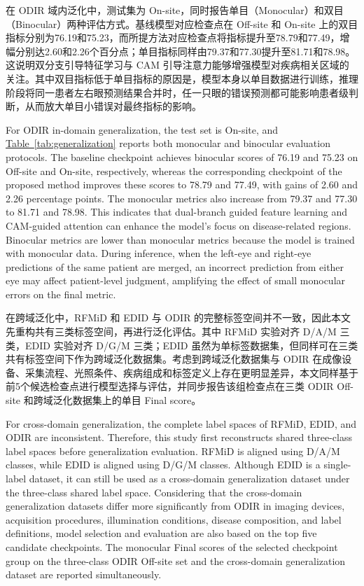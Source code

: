 

在 ODIR 域内泛化中，测试集为 On-site，同时报告单目（Monocular）和双目（Binocular）两种评估方式。基线模型对应检查点在 Off-site 和 On-site 上的双目指标分别为76.19和75.23，而所提方法对应检查点将指标提升至78.79和77.49，增幅分别达2.60和2.26个百分点；单目指标同样由79.37和77.30提升至81.71和78.98。这说明双分支引导特征学习与 CAM 引导注意力能够增强模型对疾病相关区域的关注。其中双目指标低于单目指标的原因是，模型本身以单目数据进行训练，推理阶段将同一患者左右眼预测结果合并时，任一只眼的错误预测都可能影响患者级判断，从而放大单目小错误对最终指标的影响。

For ODIR in-domain generalization, the test set is On-site, and \hyperref[tab:generalization]{Table~\ref*{tab:generalization}} reports both monocular and binocular evaluation protocols. The baseline checkpoint achieves binocular scores of 76.19 and 75.23 on Off-site and On-site, respectively, whereas the corresponding checkpoint of the proposed method improves these scores to 78.79 and 77.49, with gains of 2.60 and 2.26 percentage points. The monocular metrics also increase from 79.37 and 77.30 to 81.71 and 78.98. This indicates that dual-branch guided feature learning and CAM-guided attention can enhance the model's focus on disease-related regions. Binocular metrics are lower than monocular metrics because the model is trained with monocular data. During inference, when the left-eye and right-eye predictions of the same patient are merged, an incorrect prediction from either eye may affect patient-level judgment, amplifying the effect of small monocular errors on the final metric.

在跨域泛化中，RFMiD 和 EDID 与 ODIR 的完整标签空间并不一致，因此本文先重构共有三类标签空间，再进行泛化评估。其中 RFMiD 实验对齐 D/A/M 三类，EDID 实验对齐 D/G/M 三类；EDID 虽然为单标签数据集，但同样可在三类共有标签空间下作为跨域泛化数据集。考虑到跨域泛化数据集与 ODIR 在成像设备、采集流程、光照条件、疾病组成和标签定义上存在更明显差异，本文同样基于前5个候选检查点进行模型选择与评估，并同步报告该组检查点在三类 ODIR Off-site 和跨域泛化数据集上的单目 Final score。

For cross-domain generalization, the complete label spaces of RFMiD, EDID, and ODIR are inconsistent. Therefore, this study first reconstructs shared three-class label spaces before generalization evaluation. RFMiD is aligned using D/A/M classes, while EDID is aligned using D/G/M classes. Although EDID is a single-label dataset, it can still be used as a cross-domain generalization dataset under the three-class shared label space. Considering that the cross-domain generalization datasets differ more significantly from ODIR in imaging devices, acquisition procedures, illumination conditions, disease composition, and label definitions, model selection and evaluation are also based on the top five candidate checkpoints. The monocular Final scores of the selected checkpoint group on the three-class ODIR Off-site set and the cross-domain generalization dataset are reported simultaneously.

